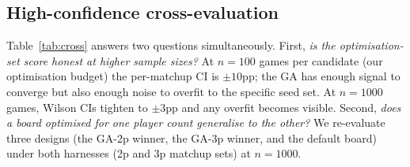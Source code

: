 \documentclass[10pt]{article}
\begin{document}
\subsection{High-confidence cross-evaluation}\label{sec:cross}

Table~\ref{tab:cross} answers two questions simultaneously. First,
\emph{is the optimisation-set score honest at higher sample sizes?} At
$n{=}100$ games per candidate (our optimisation budget) the per-matchup
CI is $\pm 10$pp; the GA has enough signal to converge but also enough
noise to overfit to the specific seed set. At $n{=}1000$ games, Wilson
CIs tighten to $\pm 3$pp and any overfit becomes visible. Second,
\emph{does a board optimised for one player count generalise to the
other?} We re-evaluate three designs (the GA-2p winner, the GA-3p
winner, and the default board) under both harnesses (2p and 3p matchup
sets) at $n{=}1000$.
\end{document}
